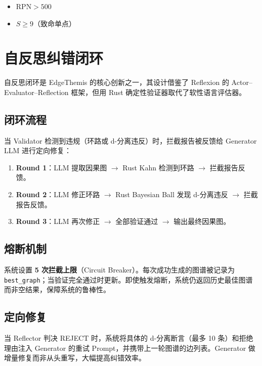 \documentclass[12pt, a4paper]{ctexart}
\begin{document}
\begin{itemize}
  \item $\text{RPN} > 500$
  \item $S \geq 9$（致命单点）
\end{itemize}

\section{自反思纠错闭环}

自反思闭环是 EdgeThemis 的核心创新之一，其设计借鉴了 Reflexion\cite{reflexion2023} 的 Actor--Evaluator--Reflection 框架，但用 Rust 确定性验证器取代了软性语言评估器。

\subsection{闭环流程}

当 Validator 检测到违规（环路或 d-分离违反）时，拦截报告被反馈给 Generator LLM 进行定向修复：
\begin{enumerate}
  \item \textbf{Round 1}：LLM 提取因果图 $\to$ Rust Kahn 检测到环路 $\to$ 拦截报告反馈。
  \item \textbf{Round 2}：LLM 修正环路 $\to$ Rust Bayesian Ball 发现 d-分离违反 $\to$ 拦截报告反馈。
  \item \textbf{Round 3}：LLM 再次修正 $\to$ 全部验证通过 $\to$ 输出最终因果图。
\end{enumerate}

\subsection{熔断机制}

系统设置 \textbf{5 次拦截上限}（Circuit Breaker）。每次成功生成的图谱被记录为 \texttt{best\_graph}；当验证完全通过时更新。即使触发熔断，系统仍返回历史最佳图谱而非空结果，保障系统的鲁棒性。

\subsection{定向修复}

当 Reflector 判决 REJECT 时，系统将具体的 d-分离断言（最多 10 条）和拒绝理由注入 Generator 的重试 Prompt，并携带上一轮图谱的边列表。Generator 做增量修复而非从头重写，大幅提高纠错效率。

\end{document}
